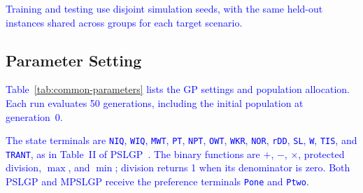 \documentclass[10pt,journal]{IEEEtran}
\newcommand{\revision}[1]{\textcolor{blue}{#1}}
\begin{document}
\revision{Training and testing use disjoint simulation seeds, with the same held-out instances shared across groups for each target scenario.}

\subsection{Parameter Setting}
\revision{Table~\ref{tab:common-parameters} lists the GP settings and population allocation. Each run evaluates 50 generations, including the initial population at generation~0.}

\revision{The state terminals are \texttt{NIQ}, \texttt{WIQ}, \texttt{MWT}, \texttt{PT}, \texttt{NPT}, \texttt{OWT}, \texttt{WKR}, \texttt{NOR}, \texttt{rDD}, \texttt{SL}, \texttt{W}, \texttt{TIS}, and \texttt{TRANT}, as in Table~II of PSLGP~\cite{xu2026pslgp}. The binary functions are $+$, $-$, $\times$, protected division, $\max$, and $\min$; division returns 1 when its denominator is zero. Both PSLGP and MPSLGP receive the preference terminals \texttt{Pone} and \texttt{Ptwo}.}
\end{document}
